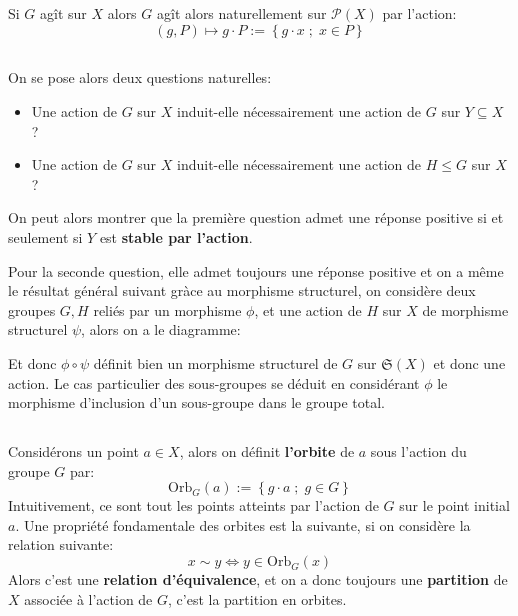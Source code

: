 \subsection*{}
Si \(G\) agît sur \( X \) alors \( G\) agît alors naturellement sur \( \mathcal{P}(X)  \) par l'action:
\[ 
   (g, P) \mapsto g \cdot P := \left\{ g \cdot x \; ; \; x \in P \right\} 
\]
\subsection*{}
On se pose alors deux questions naturelles:
\begin{itemize}
   \item Une action de \( G \) sur \( X \) induit-elle nécessairement une action de \( G \) sur \( Y \subseteq X \) ?
   \item Une action de \( G \) sur \( X \) induit-elle nécessairement une action de \( H \leq G \) sur \(X\) ?
\end{itemize}
On peut alors montrer que la première question admet une réponse positive si et seulement si \( Y \) est \textbf{stable par l'action}.\<

Pour la seconde question, elle admet toujours une réponse positive et on a même le résultat général suivant gràce au morphisme structurel, on considère deux groupes \( G, H \) reliés par un morphisme \( \phi \), et une action de \( H \) sur \( X \) de morphisme structurel \( \psi \), alors on a le diagramme:
\begin{center}
\end{center}
Et donc \( \phi \circ \psi \) définit bien un morphisme structurel de \( G \) sur \( \mathfrak{S}(X) \) et donc une action. Le cas particulier des sous-groupes se déduit en considérant \( \phi \) le morphisme d'inclusion d'un sous-groupe dans le groupe total.
\pagebreak

\subsection*{}
Considérons un point \( a \in X \), alors on définit \textbf{l'orbite} de \( a \) sous l'action du groupe \( G \) par:
\[ 
   \text{Orb}_G(a) := \left\{ g \cdot a \; ; \; g \in G \right\} 
\]
Intuitivement, ce sont tout les points atteints par l'action de \( G \) sur le point initial \( a \). Une propriété fondamentale des orbites est la suivante, si on considère la relation suivante:
\[ 
   x \sim y \iff y \in \text{Orb}_G(x)
\]
Alors c'est une \textbf{relation d'équivalence}, et on a donc toujours une \textbf{partition} de \( X \) associée à l'action de \( G \), c'est la partition en orbites.

